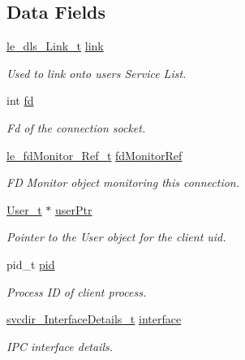 \subsection*{Data Fields}
\begin{DoxyCompactItemize}
\item 
\hyperlink{structle__dls___link__t}{le\+\_\+dls\+\_\+\+Link\+\_\+t} \hyperlink{struct_server_connection__t_a31a05d4387cb8b71ce3c77630659aa04}{link}
\begin{DoxyCompactList}\small\item\em Used to link onto user\textquotesingle{}s Service List. \end{DoxyCompactList}\item 
int \hyperlink{struct_server_connection__t_ac41dae8d857e9f93f971b47cf300c88c}{fd}
\begin{DoxyCompactList}\small\item\em Fd of the connection socket. \end{DoxyCompactList}\item 
\hyperlink{le__fd_monitor_8h_a85048556f0b95147af81e76907895d42}{le\+\_\+fd\+Monitor\+\_\+\+Ref\+\_\+t} \hyperlink{struct_server_connection__t_adfd17f6c6d6e498ce1b27b4dd803d5e4}{fd\+Monitor\+Ref}
\begin{DoxyCompactList}\small\item\em FD Monitor object monitoring this connection. \end{DoxyCompactList}\item 
\hyperlink{struct_user__t}{User\+\_\+t} $\ast$ \hyperlink{struct_server_connection__t_a097a2c382140d38225e5b04e62e18f77}{user\+Ptr}
\begin{DoxyCompactList}\small\item\em Pointer to the User object for the client uid. \end{DoxyCompactList}\item 
pid\+\_\+t \hyperlink{struct_server_connection__t_a0306c6e70546afd3029a91e8bad91742}{pid}
\begin{DoxyCompactList}\small\item\em Process ID of client process. \end{DoxyCompactList}\item 
\hyperlink{structsvcdir___interface_details__t}{svcdir\+\_\+\+Interface\+Details\+\_\+t} \hyperlink{struct_server_connection__t_a85bb27f0f25c32be0eec56e2d9f588ec}{interface}
\begin{DoxyCompactList}\small\item\em I\+PC interface details. \end{DoxyCompactList}\end{DoxyCompactItemize}



